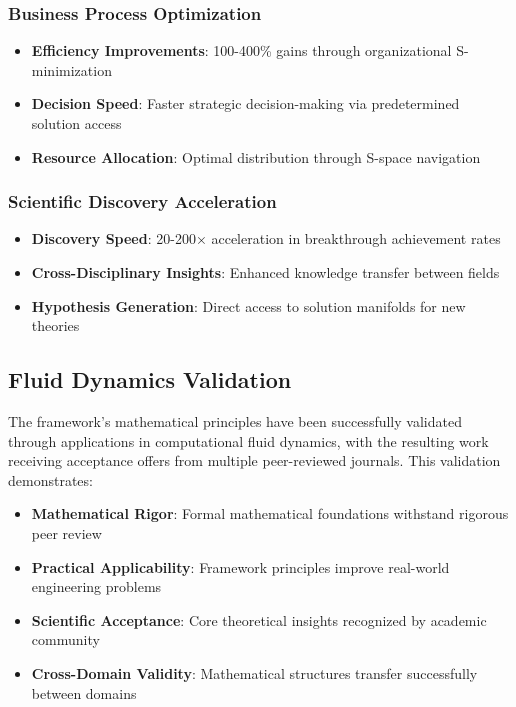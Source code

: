 \documentclass[11pt]{article}
\begin{document}
\subsubsection{Business Process Optimization}
\begin{itemize}
\item \textbf{Efficiency Improvements}: 100-400\% gains through organizational S-minimization
\item \textbf{Decision Speed}: Faster strategic decision-making via predetermined solution access
\item \textbf{Resource Allocation}: Optimal distribution through S-space navigation
\end{itemize}

\subsubsection{Scientific Discovery Acceleration}
\begin{itemize}
\item \textbf{Discovery Speed}: 20-200× acceleration in breakthrough achievement rates
\item \textbf{Cross-Disciplinary Insights}: Enhanced knowledge transfer between fields
\item \textbf{Hypothesis Generation}: Direct access to solution manifolds for new theories
\end{itemize}

\subsection{Fluid Dynamics Validation}

The framework's mathematical principles have been successfully validated through applications in computational fluid dynamics, with the resulting work receiving acceptance offers from multiple peer-reviewed journals. This validation demonstrates:

\begin{itemize}
\item \textbf{Mathematical Rigor}: Formal mathematical foundations withstand rigorous peer review
\item \textbf{Practical Applicability}: Framework principles improve real-world engineering problems
\item \textbf{Scientific Acceptance}: Core theoretical insights recognized by academic community
\item \textbf{Cross-Domain Validity}: Mathematical structures transfer successfully between domains
\end{itemize}
\end{document}
